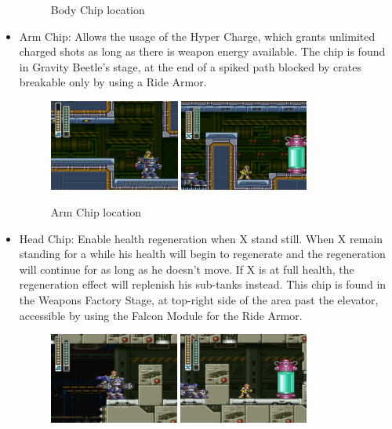 \begin{itemize}
\begin{figure}[htp]
		\caption{Body Chip location}
	\end{figure}
	\item Arm Chip: Allows the usage of the Hyper Charge, which grants unlimited charged shots as long as there is weapon energy available. The chip is found in Gravity Beetle's stage, at the end of a spiked path blocked by crates breakable only by using a Ride Armor.
	\begin{figure}[htp]
		\centering
		\includegraphics[height=3cm]{figures/X3/Gravity_beetle/Armor_1.png}
		\includegraphics[height=3cm]{figures/X3/Gravity_beetle/Armor_2.png}
		\caption{Arm Chip location}
	\end{figure}
	\item Head Chip: Enable health regeneration when X stand still. When X remain standing for a while his health will begin to regenerate and the regeneration will continue for as long as he doesn't move. If X is at full health, the regeneration effect will replenish his sub-tanks instead. This chip is found in the Weapons Factory Stage, at top-right side of the area past the elevator, accessible by using the Falcon Module for the Ride Armor.
	\begin{figure}[htp]
		\centering
		\includegraphics[height=3cm]{figures/X3/Blast_hornet/Armor_1.png}
		\includegraphics[height=3cm]{figures/X3/Blast_hornet/Armor_2.png}

\end{figure}
\end{itemize}
